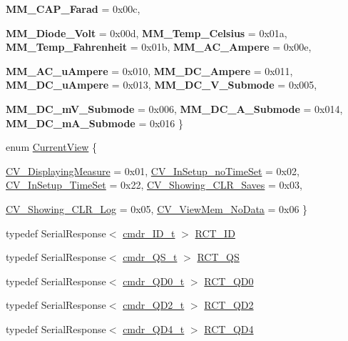 \begin{DoxyCompactItemize}
{\bfseries MM\_\-CAP\_\-Farad} = 0x00c, 
\par
{\bfseries MM\_\-Diode\_\-Volt} = 0x00d, 
{\bfseries MM\_\-Temp\_\-Celsius} = 0x01a, 
{\bfseries MM\_\-Temp\_\-Fahrenheit} = 0x01b, 
{\bfseries MM\_\-AC\_\-Ampere} = 0x00e, 
\par
{\bfseries MM\_\-AC\_\-uAmpere} = 0x010, 
{\bfseries MM\_\-DC\_\-Ampere} = 0x011, 
{\bfseries MM\_\-DC\_\-uAmpere} = 0x013, 
{\bfseries MM\_\-DC\_\-V\_\-Submode} = 0x005, 
\par
{\bfseries MM\_\-DC\_\-mV\_\-Submode} = 0x006, 
{\bfseries MM\_\-DC\_\-A\_\-Submode} = 0x014, 
{\bfseries MM\_\-DC\_\-mA\_\-Submode} = 0x016
 \}
\item 
enum \hyperlink{classFluke_1_1Fluke189_a11aaf5d2869234a68421edbb9f836c6f}{CurrentView} \{ \par
\hyperlink{classFluke_1_1Fluke189_a11aaf5d2869234a68421edbb9f836c6fae5c347ff82e9c2f2b53e11653f6fbd5e}{CV\_\-DisplayingMeasure} = 0x01, 
\hyperlink{classFluke_1_1Fluke189_a11aaf5d2869234a68421edbb9f836c6faddc163a5db0566fba8e66beeac6f5f62}{CV\_\-InSetup\_\-noTimeSet} = 0x02, 
\hyperlink{classFluke_1_1Fluke189_a11aaf5d2869234a68421edbb9f836c6faa94135b8352a110010435898bda650f6}{CV\_\-InSetup\_\-TimeSet} = 0x22, 
\hyperlink{classFluke_1_1Fluke189_a11aaf5d2869234a68421edbb9f836c6fa376c8ca6663cd9e5d1b2b1203f381146}{CV\_\-Showing\_\-CLR\_\-Saves} = 0x03, 
\par
\hyperlink{classFluke_1_1Fluke189_a11aaf5d2869234a68421edbb9f836c6fa9a4fbce8291814fc698aa01bc696dbb8}{CV\_\-Showing\_\-CLR\_\-Log} = 0x05, 
\hyperlink{classFluke_1_1Fluke189_a11aaf5d2869234a68421edbb9f836c6fa50f190b26efec7f2ff16d731d4807837}{CV\_\-ViewMem\_\-NoData} = 0x06
 \}
\item 
typedef SerialResponse$<$ \hyperlink{structFluke_1_1Fluke189_1_1cmdr__ID__t}{cmdr\_\-ID\_\-t} $>$ \hyperlink{classFluke_1_1Fluke189_a07788d6f33a7dd54b3a66373b5addded}{RCT\_\-ID}
\item 
typedef SerialResponse$<$ \hyperlink{structFluke_1_1Fluke189_1_1cmdr__QS__t}{cmdr\_\-QS\_\-t} $>$ \hyperlink{classFluke_1_1Fluke189_a9fee860a536aaaa113af0248791e9fef}{RCT\_\-QS}
\item 
typedef SerialResponse$<$ \hyperlink{structFluke_1_1Fluke189_1_1cmdr__QD0__t}{cmdr\_\-QD0\_\-t} $>$ \hyperlink{classFluke_1_1Fluke189_a9a5b405bb506cd2482de2f8bb0bea189}{RCT\_\-QD0}
\item 
typedef SerialResponse$<$ \hyperlink{structFluke_1_1Fluke189_1_1cmdr__QD2__t}{cmdr\_\-QD2\_\-t} $>$ \hyperlink{classFluke_1_1Fluke189_a6dcb8bdb7e09aba26dd95d49f56690cf}{RCT\_\-QD2}
\item 
typedef SerialResponse$<$ \hyperlink{structFluke_1_1Fluke189_1_1cmdr__QD4__t}{cmdr\_\-QD4\_\-t} $>$ \hyperlink{classFluke_1_1Fluke189_a82ebb2c4106833e320c8b18b968a5e22}{RCT\_\-QD4}
\end{DoxyCompactItemize}
